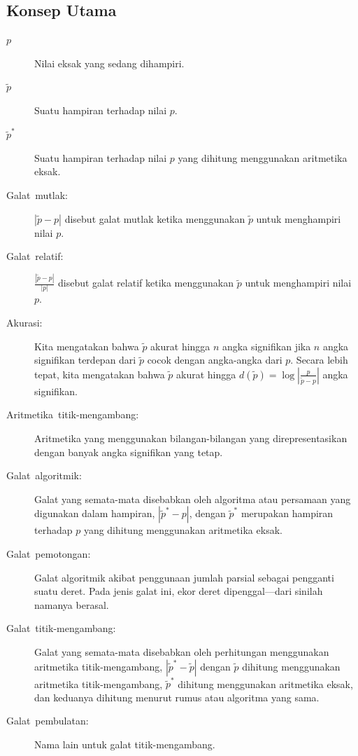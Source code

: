\subsection{Konsep Utama}
\begin{description}
\item [{$p$}] Nilai eksak yang sedang dihampiri.
\item [{$\tilde{p}$}] Suatu hampiran terhadap nilai $p$.
\item [{$\tilde{p}^{*}$}] Suatu hampiran terhadap nilai $p$ yang dihitung
menggunakan aritmetika eksak.
\item [{Galat~mutlak:}] $|\tilde{p}-p|$ disebut
galat mutlak ketika menggunakan $\tilde{p}$ untuk menghampiri nilai
$p$.
\item [{Galat~relatif:}] ${\displaystyle \frac{|\tilde{p}-p|}{|p|}}$
disebut galat relatif ketika menggunakan $\tilde{p}$ untuk menghampiri
nilai $p$.
\item [{Akurasi:}] Kita mengatakan bahwa $\tilde{p}$ akurat
hingga $n$ angka signifikan jika $n$ angka signifikan terdepan dari
$\tilde{p}$ cocok dengan angka-angka dari $p$. Secara lebih tepat,
kita mengatakan bahwa $\tilde{p}$ akurat hingga $d(\tilde{p})=\log\left|\frac{p}{\tilde{p}-p}\right|$
angka signifikan.
\item [{Aritmetika~titik-mengambang:}] Aritmetika
yang menggunakan bilangan-bilangan yang direpresentasikan dengan banyak
angka signifikan yang tetap.
\item [{Galat~algoritmik:}] Galat yang semata-mata
disebabkan oleh algoritma atau persamaan yang digunakan dalam hampiran,
$|\tilde{p}^{*}-p|$, dengan $\tilde{p}^{*}$ merupakan hampiran terhadap
$p$ yang dihitung menggunakan aritmetika eksak.
\item [{Galat~pemotongan:}] Galat algoritmik
akibat penggunaan jumlah parsial sebagai pengganti suatu deret. Pada
jenis galat ini, ekor deret dipenggal---dari sinilah namanya berasal.
\item [{Galat~titik-mengambang:}] Galat
yang semata-mata disebabkan oleh perhitungan menggunakan aritmetika
titik-mengambang, $|\tilde{p}^{*}-\tilde{p}|$ dengan $\tilde{p}$
dihitung menggunakan aritmetika titik-mengambang, $\tilde{p}^{*}$
dihitung menggunakan aritmetika eksak, dan keduanya dihitung menurut
rumus atau algoritma yang sama.
\item [{Galat~pembulatan:}] Nama lain untuk galat
titik-mengambang.
\end{description}

